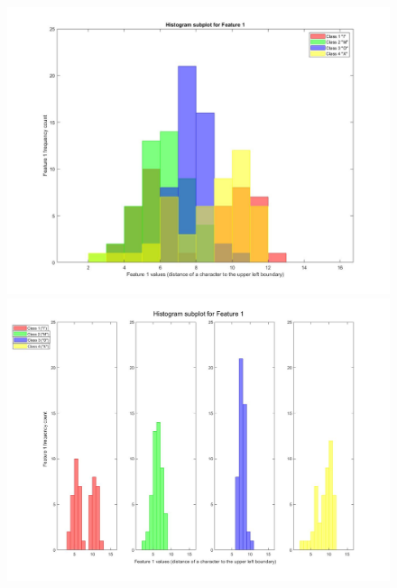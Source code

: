 \documentclass[a4paper,12pt]{article}
\begin{document}
\begin{figure}[H]
\centering
\includegraphics[scale=0.3]{q1pc_1.jpg}
\includegraphics[scale=0.3]{q1pcs_1.jpg}
\end{figure}
\pagebreak
\end{document}
